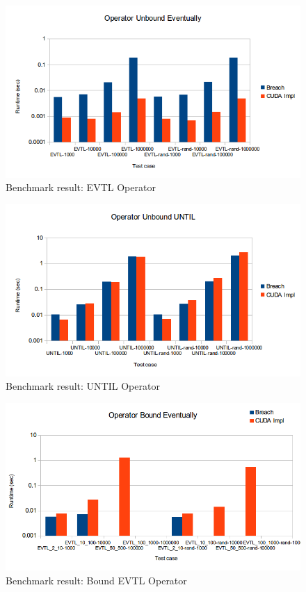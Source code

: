 \documentclass[a4paper,10pt]{article}
\begin{document}
\begin{figure}[H]
    \includegraphics[scale=0.5]{bm_evtl.png}
    \caption{
        \label{fig:bm_evtl}
        Benchmark result: EVTL Operator}
\end{figure}

\begin{figure}[H]
    \includegraphics[scale=0.5]{bm_until.png}
    \caption{
        \label{fig:bm_until}
        Benchmark result: UNTIL Operator}
\end{figure}

\begin{figure}[H]
    \includegraphics[scale=0.4]{bm_bevtl.png}
    \caption{
        \label{fig:bm_bevtl}
        Benchmark result: Bound EVTL Operator}
\end{figure}
\end{document}
